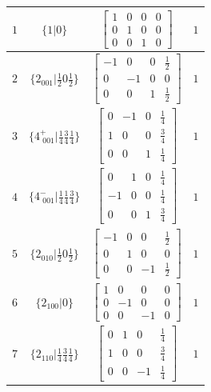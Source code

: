 \documentclass[fleqn,8pt]{jsarticle}
\begin{document}
\begin{longtable}{cccc}
$ 1 $ & $ \{1|0\} $ & $ \begin{bmatrix} 1 & 0 & 0 & 0 \\ 0 & 1 & 0 & 0 \\ 0 & 0 & 1 & 0 \end{bmatrix} $ & $ 1 $ \\ \hline
$ 2 $ & $ \{2{}_{001}|\frac{1}{2} 0 \frac{1}{2}\} $ & $ \begin{bmatrix} -1 & 0 & 0 & \frac{1}{2} \\ 0 & -1 & 0 & 0 \\ 0 & 0 & 1 & \frac{1}{2} \end{bmatrix} $ & $ 1 $ \\ \hline
$ 3 $ & $ \{4^{+}_{\,\,001}|\frac{1}{4} \frac{3}{4} \frac{1}{4}\} $ & $ \begin{bmatrix} 0 & -1 & 0 & \frac{1}{4} \\ 1 & 0 & 0 & \frac{3}{4} \\ 0 & 0 & 1 & \frac{1}{4} \end{bmatrix} $ & $ 1 $ \\ \hline
$ 4 $ & $ \{4^{-}_{\,\,001}|\frac{1}{4} \frac{1}{4} \frac{3}{4}\} $ & $ \begin{bmatrix} 0 & 1 & 0 & \frac{1}{4} \\ -1 & 0 & 0 & \frac{1}{4} \\ 0 & 0 & 1 & \frac{3}{4} \end{bmatrix} $ & $ 1 $ \\ \hline
$ 5 $ & $ \{2{}_{010}|\frac{1}{2} 0 \frac{1}{2}\} $ & $ \begin{bmatrix} -1 & 0 & 0 & \frac{1}{2} \\ 0 & 1 & 0 & 0 \\ 0 & 0 & -1 & \frac{1}{2} \end{bmatrix} $ & $ 1 $ \\ \hline
$ 6 $ & $ \{2{}_{100}|0\} $ & $ \begin{bmatrix} 1 & 0 & 0 & 0 \\ 0 & -1 & 0 & 0 \\ 0 & 0 & -1 & 0 \end{bmatrix} $ & $ 1 $ \\ \hline
$ 7 $ & $ \{2{}_{110}|\frac{1}{4} \frac{3}{4} \frac{1}{4}\} $ & $ \begin{bmatrix} 0 & 1 & 0 & \frac{1}{4} \\ 1 & 0 & 0 & \frac{3}{4} \\ 0 & 0 & -1 & \frac{1}{4} \end{bmatrix} $ & $ 1 $ \\ \hline

\end{longtable}
\end{document}

